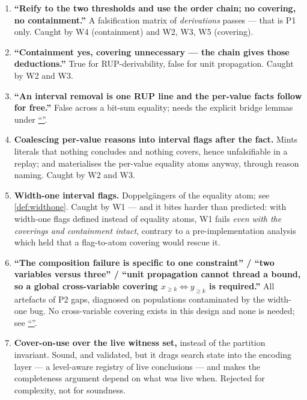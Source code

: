 \documentclass[11pt,a4paper]{article}
\theoremstyle{plain}
\theoremstyle{definition}
\theoremstyle{remark}
\newcommand{\atge}[2]{#1_{\geq #2}}
\newcommand{\nsec}[1]{\hyperref[#1]{``\nameref*{#1}''}}
\begin{document}
\begin{enumerate}[itemsep=3pt]

\item \textbf{``Reify to the two thresholds and use the order chain; no covering, no
  containment.''}  A falsification matrix of \emph{derivations} passes --- that
  is P1 only.  Caught by W4 (containment) and W2, W3, W5 (covering).

\item \textbf{``Containment yes, covering unnecessary --- the chain gives those
  deductions.''}  True for RUP-derivability, false for unit propagation.  Caught
  by W2 and W3.

\item \textbf{``An interval removal is one RUP line and the per-value facts
  follow for free.''}  False across a bit-sum equality; needs the explicit
  bridge lemmas under \nsec{sec:notprovided}.

\item \textbf{Coalescing per-value reasons into interval flags after the fact.}
  Mints literals that nothing concludes and nothing covers, hence unfalsifiable
  in a replay; and materialises the per-value equality atoms anyway, through
  reason naming.  Caught by W2 and W3.

\item \textbf{Width-one interval flags.}  Doppelg\"angers of the equality atom;
  see \cref{def:widthone}.  Caught by W1 --- and it bites harder than predicted:
  with width-one flags defined instead of equality atoms, W1 fails \emph{even
  with the coverings and containment intact}, contrary to a pre-implementation
  analysis which held that a flag-to-atom covering would rescue it.

\item \textbf{``The composition failure is specific to one constraint'' /
  ``two variables versus three'' / ``unit propagation cannot thread a bound, so
  a global cross-variable covering $\atge{x}{k}\Leftrightarrow\atge{y}{k}$ is
  required.''}  All artefacts of P2 gaps, diagnosed on populations contaminated
  by the width-one bug.  No cross-variable covering exists in this design and
  none is needed; see \nsec{sec:notprovided}.

\item \textbf{Cover-on-use over the live witness set,} instead of the partition
  invariant.  Sound, and validated, but it drags search state into the encoding
  layer --- a level-aware registry of live conclusions --- and makes the
  completeness argument depend on what was live when.  Rejected for complexity,
  not for soundness.


\end{enumerate}
\end{document}
